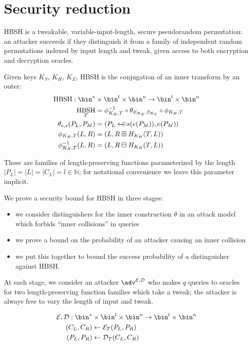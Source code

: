 \documentclass[journal=tosc,preprint,floatrow,submission]{iacrtrans}
\DeclareMathOperator{\HBSH}{HBSH}
\newcommand*{\arrowoplus}{\leftarrow\mkern-12mu\oplus}
\newcommand*{\calE}{\mathcal{E}}
\newcommand*{\calD}{\mathcal{D}}
\begin{document}
\section{Security reduction}
HBSH is a tweakable, variable-input-length, secure pseudorandom permutation: an attacker
succeeds if they distinguish it from a family of independent random permutations indexed by
input length and tweak, given access to both encryption and decryption oracles.

Given keys $K_S$, $K_H$, $K_E$, HBSH is the conjugation of an inner transform by an outer:
\begin{align*}
    \HBSH:
    \bin^* &\times \bin^l \times \bin^n \rightarrow \bin^l \times \bin^n \\
    \HBSH_{T} &= \phi^{-1}_{K_H, T}
    \circ \theta_{E_{K_E}, S_{K_S}} \circ \phi_{K_H, T} \\
    \theta_{e, s}(P_L, P_M) &= (P_L \arrowoplus s(e(P_M)), e(P_M)) \\
    \phi_{K_H, T}(L, R) &= (L, R \boxplus H_{K_H}(T, L)) \\
    \phi^{-1}_{K_H, T}(L, R) &= (L, R \boxminus H_{K_H}(T, L))
\end{align*}

These are families of length-preserving functions parameterized by the length
$|P_L| = |L| = |C_L| = l \in \mathbb{N}$;
for notational convenience we leave this parameter implicit.

We prove a security bound for HBSH in three stages:
\begin{itemize}
    \item we consider distinguishers for the inner construction $\theta$ in an
    attack model which forbids ``inner collisions'' in queries
    \item we prove a bound on the probability of an attacker causing an inner collision
    \item we put this together to bound the success probability of a distinguisher against
    HBSH.
\end{itemize}

At each stage, we consider an attacker \(\adv^{\calE, \calD}\) who makes $q$ queries
to oracles for
two length-preserving function families which take a tweak; the attacker is always free to vary
the length of input and tweak.

\begin{align*}
\calE, \calD:
\bin^* &\times \bin^l \times \bin^n \rightarrow \bin^l \times \bin^n \\
(C_L, C_R) &\leftarrow \calE_T(P_L, P_R) \\
(P_L, P_R) &\leftarrow \calD_T(C_L, C_R) \\
\end{align*}
\end{document}
